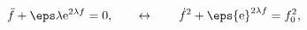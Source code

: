 \begin{equation}
\ddot f + \eps \lambda {\rm e}^{2 \lambda f} = 0, \qquad
\leftrightarrow \qquad \dot f^2 + \eps {\rm e}^{2 \lambda f} =
f_0^2,
\end{equation}

